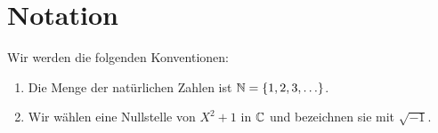 \chapter{Notation}

Wir werden die folgenden Konventionen:

\begin{enumerate}
\item Die Menge der natürlichen Zahlen ist ${\mathbb{N}} = \{1,2,3,\ldots\}$.

\item Wir wählen eine Nullstelle von $X^2+1$ in ${\mathbb{C}}$ und bezeichnen sie
  mit $\sqrt{-1}$. 
\end{enumerate}

